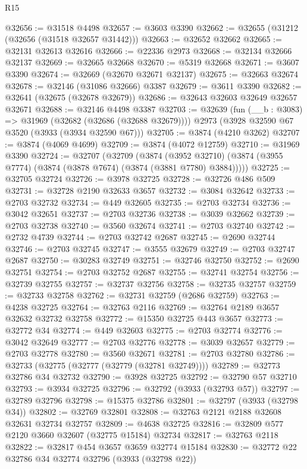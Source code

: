 \begin{lexlean}{R15}
\begin{coremodule}
@32656 := @31518 @4498
@32657 := @3603 @3390
@32662 := @32655 (@31212 (@32656 (@31518 @32657 @31442)))
@32663 := @32652 @32662
@32665 := @32131 @32613 @32616
@32666 := @22336 @2973
@32668 := @32134 @32666 @32137
@32669 := @32665 @32668
@32670 := @5319 @32668
@32671 := @3607 @3390
@32674 := @32669 (@32670 @32671 @32137)
@32675 := @32663 @32674
@32678 := @32146 (@31086 @32666) @3387
@32679 := @3611 @3390
@32682 := @32641 (@32675 (@32678 @32679))
@32686 := @32643 @32603 @32649 @32657 @32671
@32688 := @32146 @4498 @3387
@32703 := @32639
    (fun (__b : @3083) => @31969 (@32682 (@32686 (@32688 @32679))))
    @2973
    (@3928 @32590 @67 @3520 (@3933 (@3934 @32590 @67)))
@32705 := @3874 (@4210 @3262)
@32707 := @3874 (@4069 @4699)
@32709 := @3874 (@4072 @12759)
@32710 := @31969 @3390
@32724 := @32707
    (@32709
      (@3874
        (@3952 @32710)
        (@3874 (@3955 @7774) (@3874 (@3878 @7674) (@3874 (@3881 @7780) @3884)))))
@32725 := @32705 @32724
@32726 := @3978 @32725
@32728 := @32726 @486 @509
@32731 := @32728 @2190 @32633 @3657
@32732 := @3084 @32642
@32733 := @2703 @32732
@32734 := @449 @32605
@32735 := @2703 @32734
@32736 := @3042 @32651
@32737 := @2703 @32736
@32738 := @3039 @32662
@32739 := @2703 @32738
@32740 := @3560 @32674
@32741 := @2703 @32740
@32742 := @2732 @4739
@32744 := @2703 @32742 @2687
@32745 := @2690 @32744
@32746 := @2703 @32745
@32747 := @3555 @32679
@32749 := @2703 @32747 @2687
@32750 := @30283 @32749
@32751 := @32746 @32750
@32752 := @2690 @32751
@32754 := @2703 @32752 @2687
@32755 := @32741 @32754
@32756 := @32739 @32755
@32757 := @32737 @32756
@32758 := @32735 @32757
@32759 := @32733 @32758
@32762 := @32731 @32759 (@2686 @32759)
@32763 := @4238 @32725
@32764 := @32763 @2116
@32769 := @32764 @2189 @3657 @32632 @32732 @32758
@32772 := @15350 @32725 @443 @3657
@32773 := @32772 @34
@32774 := @449 @32603
@32775 := @2703 @32774
@32776 := @3042 @32649
@32777 := @2703 @32776
@32778 := @3039 @32657
@32779 := @2703 @32778
@32780 := @3560 @32671
@32781 := @2703 @32780
@32786 := @32733 (@32775 (@32777 (@32779 (@32781 @32749))))
@32789 := @32773 @32786 @34 @32732
@32790 := @3928 @32725
@32792 := @32790 @57 @32710
@32793 := @3934 @32725
@32796 := @32792 (@3933 (@32793 @57))
@32797 := @32789 @32796
@32798 := @15375 @32786
@32801 := @32797 (@3933 (@32798 @34))
@32802 := @32769 @32801
@32808 := @32763 @2121 @2188 @32608 @32631 @32734 @32757
@32809 := @4638 @32725
@32816 := @32809 @577 @2120 @3660 @32607 (@32775 @15184) @32734
@32817 := @32763 @2118
@32822 := @32817 @454 @3657 @3659 @32774 @15184
@32830 := @32772 @22 @32786 @34 @32774 @32796 (@3933 (@32798 @22))

\end{coremodule}
\end{lexlean}
